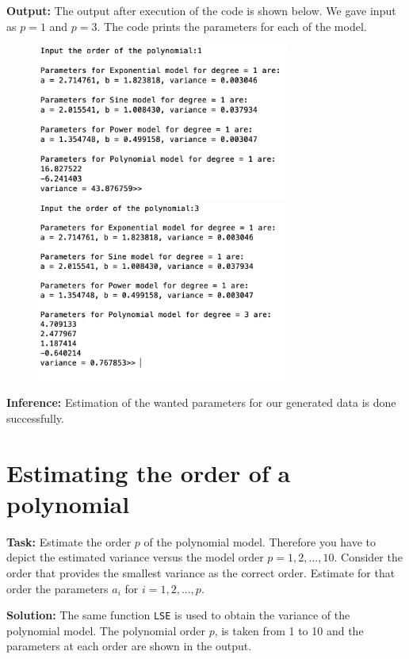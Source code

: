 \noindent \textbf{Output:}
\noindent The output after execution of the code is shown below. We gave input as $p = 1$ and $p = 3$. The code prints the parameters for each of the model.
\begin{figure}[H]
    \centering
    \includegraphics[width=8.3cm]{ass3_2.png}
    \qquad
    \includegraphics[width=8.3cm]{ass3_1.png} 
\end{figure}

\noindent \textbf{Inference:} Estimation of the wanted parameters for our generated data is done successfully.




\section{ Estimating the order of a polynomial } \label{ Estimating the order of a polynomial}
\noindent \textbf{Task:} Estimate the order $p$ of the polynomial model. Therefore you have to depict the estimated variance versus the model order $p = 1,2,...,10.$ Consider the order that provides the smallest variance as the correct order. Estimate for that order the parameters $a_i$ for $i = 1,2,...,p.$

\noindent \textbf{Solution:} The same function \texttt{LSE} is used to obtain the variance of the polynomial model. The polynomial order $p$, is taken from 1 to 10 and the parameters at each order are shown in the output. 

